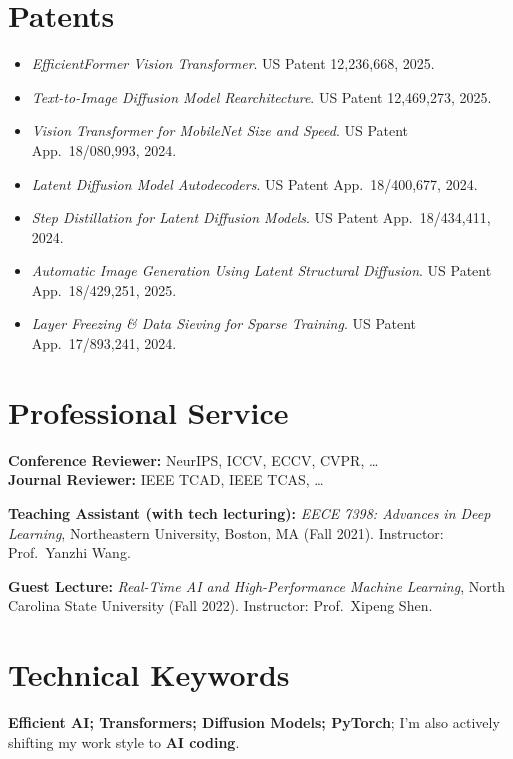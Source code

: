 \documentclass[11pt,letterpaper]{article}
\begin{document}
\section{Patents}

\begin{itemize}
    \item \textit{EfficientFormer Vision Transformer}. US Patent 12,236,668, 2025.
    \item \textit{Text-to-Image Diffusion Model Rearchitecture}. US Patent 12,469,273, 2025.
    \item \textit{Vision Transformer for MobileNet Size and Speed}. US Patent App.\ 18/080,993, 2024.
    \item \textit{Latent Diffusion Model Autodecoders}. US Patent App.\ 18/400,677, 2024.
    \item \textit{Step Distillation for Latent Diffusion Models}. US Patent App.\ 18/434,411, 2024.
    \item \textit{Automatic Image Generation Using Latent Structural Diffusion}. US Patent App.\ 18/429,251, 2025.
    \item \textit{Layer Freezing \& Data Sieving for Sparse Training}. US Patent App.\ 17/893,241, 2024.
\end{itemize}

\section{Professional Service}

\noindent\textbf{Conference Reviewer:} NeurIPS, ICCV, ECCV, CVPR, \ldots \\
\textbf{Journal Reviewer:} IEEE TCAD, IEEE TCAS, \ldots

\noindent\textbf{Teaching Assistant (with tech lecturing):} \textit{EECE 7398: Advances in Deep Learning}, Northeastern University, Boston, MA (Fall 2021). Instructor: Prof.\ Yanzhi Wang.

\noindent\textbf{Guest Lecture:} \textit{Real-Time AI and High-Performance Machine Learning}, North Carolina State University (Fall 2022). Instructor: Prof.\ Xipeng Shen.

\section{Technical Keywords}
\textbf{Efficient AI; Transformers; Diffusion Models; PyTorch}; I'm also actively shifting my work style to \textbf{AI coding}. 
\end{document}
